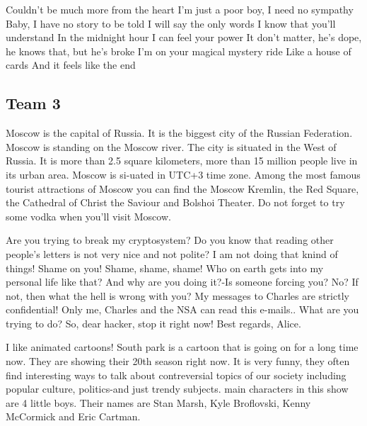 \documentclass[a4paper,11pt]{article}
\begin{document}
\begin{displayquote}
Couldn't be much more from the heart
I'm just a poor boy, I need no sympathy
Baby, I have no story to be told
I will say the only words I know that you'll understand
In the midnight hour I can feel your power
It don't matter, he's dope, he knows that, but he's broke
I'm on your magical mystery ride
Like a house of cards
And it feels like the end
\end{displayquote}

\newpage
\subsection{Team 3}
\begin{displayquote}
Moscow is the capital of Russia. It is the biggest city of the Russian Federation.
Moscow is standing on the Moscow river. The city is situated in the West of Russia.
It is more than 2.5 square kilometers, more than 15 million people live in its urban area.
Moscow is si-uated in UTC+3 time zone.
Among the most famous tourist attractions of Moscow you can find
the Moscow Kremlin, the Red Square, the Cathedral of Christ the Saviour and Bolshoi Theater.
Do not forget to try some vodka when you'll visit Moscow.
\end{displayquote}

\begin{displayquote}
Are you trying to break my cryptosystem?
Do you know that reading other people's letters is not very nice and not polite?
I am not doing that knind of things! Shame on you! Shame, shame, shame!
Who on earth gets into my personal life like that? And why are you doing it?-Is someone forcing you? No? If not, then what the hell is wrong with you?
My messages to Charles are strictly confidential! Only me, Charles and the NSA can read this e-mails..
What are you trying to do?
So, dear hacker, stop it right now!
Best regards,
Alice.
\end{displayquote}

\begin{displayquote}
I like animated cartoons!
South park is a cartoon that is going on for a long time now. They are showing their 20th season right now.
It is very funny, they often find interesting ways to talk about contreversial topics of our society
including popular culture, politics-and just trendy subjects.
main characters in this show are 4 little boys. Their names are
Stan Marsh, Kyle Broflovski, Kenny McCormick and Eric Cartman.
\end{displayquote}
\end{document}
